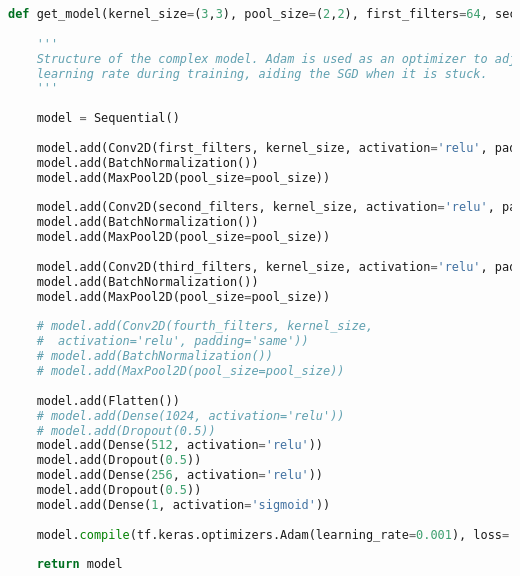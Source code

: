 \begin{lstlisting}[language=Python, caption=Model 5]
def get_model(kernel_size=(3,3), pool_size=(2,2), first_filters=64, second_filters=128, third_filters=256, fourth_filters=1024):
    
    '''
    Structure of the complex model. Adam is used as an optimizer to adjust the 
    learning rate during training, aiding the SGD when it is stuck.
    ''' 
    
    model = Sequential()    
    
    model.add(Conv2D(first_filters, kernel_size, activation='relu', padding='same', input_shape=(IMAGE_SIZE, IMAGE_SIZE, 3)))
    model.add(BatchNormalization())
    model.add(MaxPool2D(pool_size=pool_size))
    
    model.add(Conv2D(second_filters, kernel_size, activation='relu', padding='same'))
    model.add(BatchNormalization())
    model.add(MaxPool2D(pool_size=pool_size))
    
    model.add(Conv2D(third_filters, kernel_size, activation='relu', padding='same'))
    model.add(BatchNormalization())
    model.add(MaxPool2D(pool_size=pool_size))
    
    # model.add(Conv2D(fourth_filters, kernel_size, 
    #  activation='relu', padding='same'))
    # model.add(BatchNormalization())
    # model.add(MaxPool2D(pool_size=pool_size))
    
    model.add(Flatten())
    # model.add(Dense(1024, activation='relu'))
    # model.add(Dropout(0.5))
    model.add(Dense(512, activation='relu'))
    model.add(Dropout(0.5))
    model.add(Dense(256, activation='relu'))
    model.add(Dropout(0.5))
    model.add(Dense(1, activation='sigmoid'))
    
    model.compile(tf.keras.optimizers.Adam(learning_rate=0.001), loss='binary_crossentropy', metrics=['accuracy'])
    
    return model
\end{lstlisting}